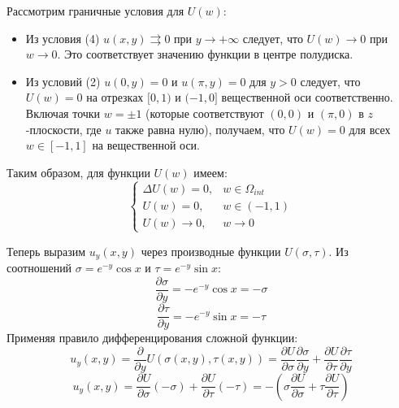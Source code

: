 \documentclass[12pt, a4paper]{article}
\begin{document}
	Рассмотрим граничные условия для $U(w)$:
	\begin{itemize}
		\item Из условия (4) $u(x,y) \rightrightarrows 0$ при $y \to +\infty$ следует, что $U(w) \to 0$ при $w \to 0$. Это соответствует значению функции в центре полудиска.
		\item Из условий (2) $u(0,y) = 0$ и $u(\pi,y) = 0$ для $y>0$ следует, что $U(w)=0$ на отрезках $[0,1)$ и $(-1,0]$ вещественной оси соответственно. Включая точки $w=\pm 1$ (которые соответствуют $(0,0)$ и $(\pi,0)$ в $z$-плоскости, где $u$ также равна нулю), получаем, что $U(w) = 0$ для всех $w \in [-1,1]$ на вещественной оси.
	\end{itemize}
	Таким образом, для функции $U(w)$ имеем:
	\begin{equation*}
		\begin{cases}
			\Delta U(w) = 0, & w \in \Omega_{int} \\
			U(w) = 0, & w \in (-1, 1) \\
			U(w) \to 0, & w \to 0
		\end{cases}
	\end{equation*}
	
	Теперь выразим $u_y(x,y)$ через производные функции $U(\sigma, \tau)$. Из соотношений $\sigma = e^{-y}\cos x$ и $\tau = e^{-y}\sin x$:
	$$\frac{\partial \sigma}{\partial y} = -e^{-y}\cos x = -\sigma$$
	$$\frac{\partial \tau}{\partial y} = -e^{-y}\sin x = -\tau$$
	Применяя правило дифференцирования сложной функции:
	$$u_y(x,y) = \frac{\partial}{\partial y} U(\sigma(x,y), \tau(x,y)) = \frac{\partial U}{\partial \sigma} \frac{\partial \sigma}{\partial y} + \frac{\partial U}{\partial \tau} \frac{\partial \tau}{\partial y}$$
	$$u_y(x,y) = \frac{\partial U}{\partial \sigma} (-\sigma) + \frac{\partial U}{\partial \tau} (-\tau) = - \left( \sigma \frac{\partial U}{\partial \sigma} + \tau \frac{\partial U}{\partial \tau} \right)$$
	
\end{document}
